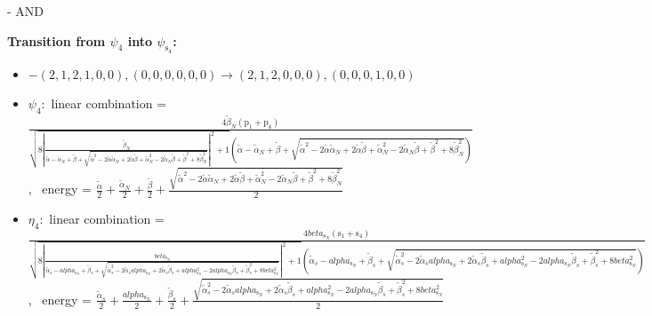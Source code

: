 \documentclass[12pt,a4paper]{article}
\begin{document}
 -  AND 

        \noindent\textbf{Transition from $\psi_{4}$ into $\psi_{\text{s}_{4}}$:}
        \begin{itemize}
            \item $- (2, 1, 2, 1, 0, 0), (0, 0, 0, 0, 0, 0) \rightarrow (2, 1, 2, 0, 0, 0), (0, 0, 0, 1, 0, 0)$
        
            \item $\psi_{4}:$ linear combination = $\frac{4 \tilde{\beta}_{N} \left(\text{p}_{1} + \text{p}_{4}\right)}{\sqrt{8 \left|{\frac{\tilde{\beta}_{N}}{\tilde{\alpha} - \tilde{\alpha}_{N} + \tilde{\beta} + \sqrt{\tilde{\alpha}^{2} - 2 \tilde{\alpha} \tilde{\alpha}_{N} + 2 \tilde{\alpha} \tilde{\beta} + \tilde{\alpha}_{N}^{2} - 2 \tilde{\alpha}_{N} \tilde{\beta} + \tilde{\beta}^{2} + 8 \tilde{\beta}_{N}^{2}}}}\right|^{2} + 1} \left(\tilde{\alpha} - \tilde{\alpha}_{N} + \tilde{\beta} + \sqrt{\tilde{\alpha}^{2} - 2 \tilde{\alpha} \tilde{\alpha}_{N} + 2 \tilde{\alpha} \tilde{\beta} + \tilde{\alpha}_{N}^{2} - 2 \tilde{\alpha}_{N} \tilde{\beta} + \tilde{\beta}^{2} + 8 \tilde{\beta}_{N}^{2}}\right)}$, \
            energy = $\frac{\tilde{\alpha}}{2} + \frac{\tilde{\alpha}_{N}}{2} + \frac{\tilde{\beta}}{2} + \frac{\sqrt{\tilde{\alpha}^{2} - 2 \tilde{\alpha} \tilde{\alpha}_{N} + 2 \tilde{\alpha} \tilde{\beta} + \tilde{\alpha}_{N}^{2} - 2 \tilde{\alpha}_{N} \tilde{\beta} + \tilde{\beta}^{2} + 8 \tilde{\beta}_{N}^{2}}}{2}$
            
            \item $\eta_{4}:$ linear combination = $\frac{4 beta_{\text{s}_N} \left(\text{s}_{1} + \text{s}_{4}\right)}{\sqrt{8 \left|{\frac{beta_{\text{s}_N}}{\tilde{\alpha}_{s} - alpha_{\text{s}_N} + \tilde{\beta}_{s} + \sqrt{\tilde{\alpha}_{s}^{2} - 2 \tilde{\alpha}_{s} alpha_{\text{s}_N} + 2 \tilde{\alpha}_{s} \tilde{\beta}_{s} + alpha_{\text{s}_N}^{2} - 2 alpha_{\text{s}_N} \tilde{\beta}_{s} + \tilde{\beta}_{s}^{2} + 8 beta_{\text{s}_N}^{2}}}}\right|^{2} + 1} \left(\tilde{\alpha}_{s} - alpha_{\text{s}_N} + \tilde{\beta}_{s} + \sqrt{\tilde{\alpha}_{s}^{2} - 2 \tilde{\alpha}_{s} alpha_{\text{s}_N} + 2 \tilde{\alpha}_{s} \tilde{\beta}_{s} + alpha_{\text{s}_N}^{2} - 2 alpha_{\text{s}_N} \tilde{\beta}_{s} + \tilde{\beta}_{s}^{2} + 8 beta_{\text{s}_N}^{2}}\right)}$, \
            energy = $\frac{\tilde{\alpha}_{s}}{2} + \frac{alpha_{\text{s}_N}}{2} + \frac{\tilde{\beta}_{s}}{2} + \frac{\sqrt{\tilde{\alpha}_{s}^{2} - 2 \tilde{\alpha}_{s} alpha_{\text{s}_N} + 2 \tilde{\alpha}_{s} \tilde{\beta}_{s} + alpha_{\text{s}_N}^{2} - 2 alpha_{\text{s}_N} \tilde{\beta}_{s} + \tilde{\beta}_{s}^{2} + 8 beta_{\text{s}_N}^{2}}}{2}$
            

\end{itemize}
\end{document}

